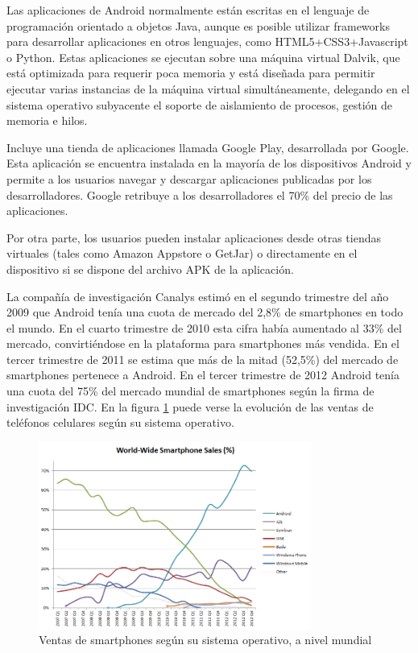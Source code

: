 Las aplicaciones de Android normalmente están escritas en el lenguaje de programación orientado a objetos Java, aunque es posible utilizar frameworks para desarrollar aplicaciones en otros lenguajes, como HTML5+CSS3+Javascript o Python. Estas aplicaciones se ejecutan sobre una máquina virtual Dalvik, que está optimizada para requerir poca memoria y está diseñada para permitir ejecutar varias instancias de la máquina virtual simultáneamente, delegando en el sistema operativo subyacente el soporte de aislamiento de procesos, gestión de memoria e hilos.

Incluye una tienda de aplicaciones llamada Google Play, desarrollada por Google. Esta aplicación se encuentra instalada en la mayoría de los dispositivos Android y permite a los usuarios navegar y descargar aplicaciones publicadas por los desarrolladores. Google retribuye a los desarrolladores el 70\% del precio de las aplicaciones.

Por otra parte, los usuarios pueden instalar aplicaciones desde otras tiendas virtuales (tales como Amazon Appstore o GetJar) o directamente en el dispositivo si se dispone del archivo APK de la aplicación.

La compañía de investigación Canalys estimó en el segundo trimestre del año 2009 que Android tenía una cuota de mercado del 2,8\% de smartphones en todo el mundo. En el cuarto trimestre de 2010 esta cifra había aumentado al 33\% del mercado, convirtiéndose en la plataforma para smartphones más vendida. En el tercer trimestre de 2011 se estima que más de la mitad (52,5\%) del mercado de smartphones pertenece a Android. En el tercer trimestre de 2012 Android tenía una cuota del 75\% del mercado mundial de smartphones según la firma de investigación IDC. En la figura \ref{fig:ventas-android} puede verse la evolución de las ventas de teléfonos celulares según su sistema operativo.

\begin{figure}[htbp]
  \centering
    \includegraphics[width=0.8\textwidth]{imagenes/ventasAndroid.png}
     \caption{Ventas de smartphones según su sistema operativo, a nivel mundial}
    \label{fig:ventas-android}
\end{figure}


